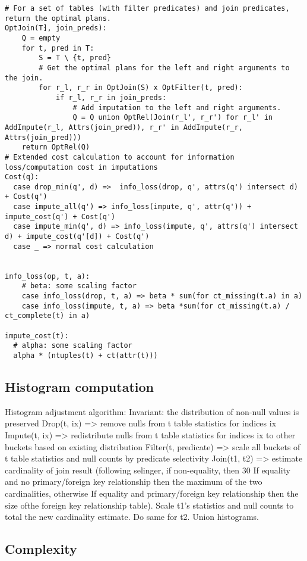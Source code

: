 \begin{verbatim}		
# For a set of tables (with filter predicates) and join predicates, return the optimal plans.
OptJoin(T⁆, join_preds):
	Q = empty
	for t, pred in T:
		S = T \ {t, pred}
		# Get the optimal plans for the left and right arguments to the join.
		for r_l, r_r in OptJoin(S) x OptFilter(t, pred):
			if r_l, r_r in join_preds:
				# Add imputation to the left and right arguments.
				Q = Q union OptRel(Join(r_l', r_r') for r_l' in AddImpute(r_l, Attrs(join_pred)), r_r' in AddImpute(r_r, Attrs(join_pred)))
	return OptRel(Q)
# Extended cost calculation to account for information loss/computation cost in imputations
Cost(q):
  case drop_min(q', d) =>  info_loss(drop, q', attrs(q') intersect d) + Cost(q')
  case impute_all(q') => info_loss(impute, q', attr(q')) + impute_cost(q') + Cost(q')
  case impute_min(q', d) => info_loss(impute, q', attrs(q') intersect d) + impute_cost(q'[d]) + Cost(q')
  case _ => normal cost calculation

  
info_loss(op, t, a):
    # beta: some scaling factor
    case info_loss(drop, t, a) => beta * sum(for ct_missing(t.a) in a)
    case info_loss(impute, t, a) => beta *sum(for ct_missing(t.a) / ct_complete(t) in a)

impute_cost(t):
  # alpha: some scaling factor
  alpha * (ntuples(t) + ct(attr(t)))
\end{verbatim}

\subsection{Histogram computation}
Histogram adjustment algorithm:
Invariant: the distribution of non-null values is preserved
Drop(t, ix) => remove nulls from t table statistics for indices ix
Impute(t, ix) => redistribute nulls from t table statistics for indices ix to other buckets based on existing distribution
Filter(t, predicate) => scale all buckets of t table statistics and null counts by predicate selectivity
Join(t1, t2) => estimate cardinality of join result (following selinger, if non-equality, then 30%
If equality and no primary/foreign key relationship then the maximum of the two cardinalities, otherwise
If equality and primary/foreign key relationship then the size ofthe foreign key relationship table). Scale t1's statistics and null counts to total the new cardinality estimate. Do same for t2. Union histograms.

\subsection{Complexity}


